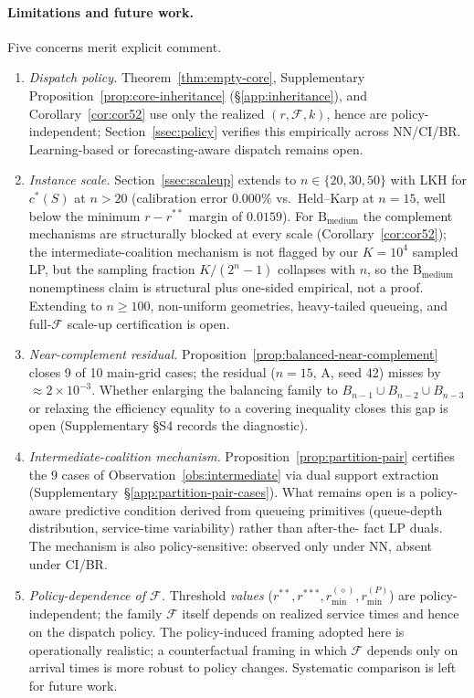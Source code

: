 \documentclass[11pt]{article}
\theoremstyle{plain}
\theoremstyle{definition}
\theoremstyle{remark}
\newcommand{\F}{\mathcal{F}}
\begin{document}
\paragraph{Limitations and future work.} Five concerns merit explicit comment.
\begin{enumerate}[label=(\roman*),leftmargin=*,itemsep=2pt,topsep=2pt]
\item \emph{Dispatch policy.} Theorem~\ref{thm:empty-core},
  Supplementary Proposition~\ref{prop:core-inheritance} (\S\ref{app:inheritance}), and
  Corollary~\ref{cor:cor52} use only the realized $(r,\F,k)$, hence are
  policy-independent; Section~\ref{ssec:policy} verifies this empirically
  across NN/CI/BR. Learning-based or forecasting-aware dispatch remains open.
\item \emph{Instance scale.} Section~\ref{ssec:scaleup} extends to
  $n\in\{20,30,50\}$ with LKH for $c^{\ast}(S)$ at $n>20$ (calibration error
  $0.000\%$ vs.\ Held--Karp at $n=15$, well below the minimum $r-r^{\ast\ast}$
  margin of $0.0159$). For $\text{B}_{\text{medium}}$ the complement
  mechanisms are structurally blocked at every scale (Corollary~\ref{cor:cor52});
  the intermediate-coalition mechanism is not flagged by our $K=10^4$ sampled
  LP, but the sampling fraction $K/(2^n-1)$ collapses with $n$, so the
  $\text{B}_{\text{medium}}$ nonemptiness claim is structural plus one-sided
  empirical, not a proof. Extending to $n\ge 100$, non-uniform geometries,
  heavy-tailed queueing, and full-$\F$ scale-up certification is open.
\item \emph{Near-complement residual.}
  Proposition~\ref{prop:balanced-near-complement} closes 9 of 10 main-grid
  cases; the residual ($n=15$, A, seed 42) misses by $\approx 2\times 10^{-3}$.
  Whether enlarging the balancing family to $B_{n-1}\cup B_{n-2}\cup B_{n-3}$
  or relaxing the efficiency equality to a covering inequality closes this gap
  is open (Supplementary \S S4 records the diagnostic).
\item \emph{Intermediate-coalition mechanism.}
  Proposition~\ref{prop:partition-pair} certifies the 9 cases of
  Observation~\ref{obs:intermediate} via dual support extraction
  (Supplementary~\S\ref{app:partition-pair-cases}). What remains open is a
  policy-aware predictive condition derived from queueing primitives
  (queue-depth distribution, service-time variability) rather than after-the-
  fact LP duals. The mechanism is also policy-sensitive: observed only under
  NN, absent under CI/BR.
\item \emph{Policy-dependence of $\F$.} Threshold \emph{values}
  ($r^{\ast\ast}, r^{\ast\ast\ast}, r^{(\diamond)}_{\min}, r^{(P)}_{\min}$)
  are policy-independent; the family $\F$ itself depends on realized service
  times and hence on the dispatch policy. The policy-induced framing adopted
  here is operationally realistic; a counterfactual framing in which $\F$
  depends only on arrival times is more robust to policy changes. Systematic
  comparison is left for future work.
\end{enumerate}
\end{document}
